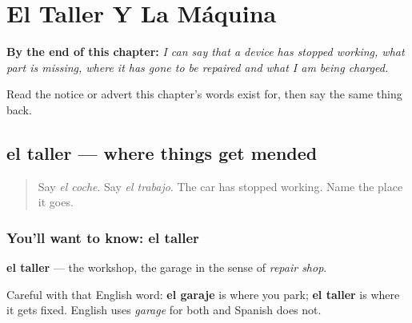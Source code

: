 
\chapter{El Taller Y La Máquina}
\label{ch:es-maquina}

\begin{chapteropening}
\textbf{By the end of this chapter:} \emph{I can say that a device has stopped working, what part is missing, where it has gone to be repaired and what I am being charged.}

Read the notice or advert this chapter's words exist for, then say the same thing back.
\end{chapteropening}

\section[el taller]{el taller — where things get mended}

\label{lesson:ES-C434-taller}



\begin{quote}
Say \emph{el coche}. Say \emph{el trabajo}. The car has stopped working. Name the place it goes.
\end{quote}

\subsection*{You'll want to know: el taller}
\textbf{el taller} — the workshop, the garage in the sense of \emph{repair shop}.

Careful with that English word: \textbf{el garaje} is where you park; \textbf{el taller} is where it gets fixed. English uses \emph{garage} for both and Spanish does not.

